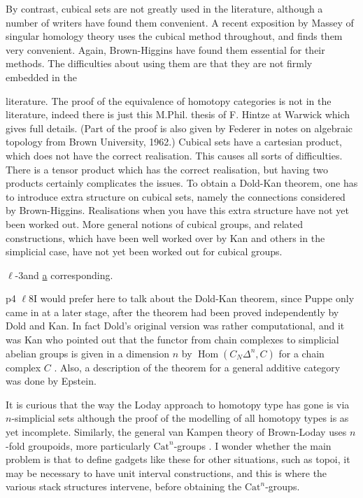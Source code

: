 By contrast, cubical sets are not greatly used in the literature, although a number of writers have found them convenient. A recent exposition by Massey of singular homology theory uses the cubical method throughout, and finds them very convenient. Again, Brown-Higgins have found them essential for their methods. The difficulties about using them are that they are not firmly embedded in the

literature. The proof of the equivalence of homotopy categories is not in the literature, indeed there is just this M.Phil. thesis of F. Hintze at Warwick which gives full details. (Part of the proof is also given by Federer in notes on algebraic topology from Brown University, 1962.) Cubical sets have a cartesian product, which does not have the correct realisation. This causes all sorts of difficulties. There is a tensor product which has the correct realisation, but having two products certainly complicates the issues. To obtain a Dold-Kan theorem, one has to introduce extra structure on cubical sets, namely the connections considered by Brown-Higgins. Realisations when you have this extra structure have not yet been worked out. More general notions of cubical groups, and related constructions, which have been well worked over by Kan and others in the simplicial case, have not yet been worked out for cubical groups.

$\ell$-3\qquad and \uline{a} corresponding.

p4 $\ell$8\qquad I would prefer here to talk about the Dold-Kan theorem, since Puppe only came in at a later stage, after the theorem had been proved independently by Dold and Kan. In fact Dold's original version was rather computational, and it was Kan who pointed out that the functor from chain complexes to simplicial abelian groups is given in a dimension $n$ by $\operatorname{Hom}(C_{N}\Delta^{n},C)$ for a chain complex $C$ . Also, a description of the theorem for a general additive category was done by Epstein.

It is curious that the way the Loday approach to homotopy type has gone is via $n$-simplicial sets although the proof of the modelling of all homotopy types is as yet incomplete. Similarly, the general van Kampen theory of Brown-Loday uses $n$-fold groupoids, more particularly $\mathrm{Cat}^{n}$-groups . I wonder whether the main problem is that to define gadgets like these for other situations, such as topoi, it may be necessary to have unit interval constructions, and this is where the various stack structures intervene, before obtaining the $\mathrm{Cat}^{n}$-groups.

